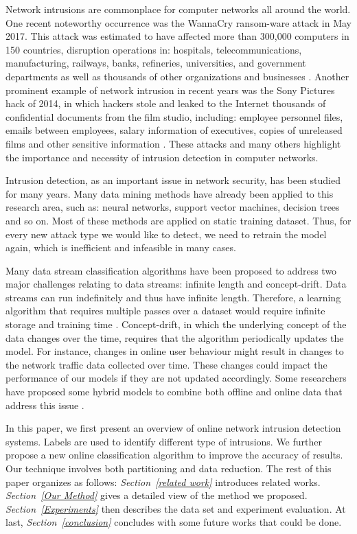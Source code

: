 \documentclass[runningheads]{llncs}
\begin{document}
	Network intrusions are commonplace for computer networks all around the world. One recent noteworthy occurrence was the WannaCry ransom-ware attack in May 2017. This attack was estimated to have affected more than 300,000 computers in 150 countries, disruption operations in: hospitals, telecommunications, manufacturing, railways, banks, refineries, universities, and government departments as well as thousands of other organizations and businesses \cite{Cameron2017}\cite{Hern2017}\cite{Eyerys2017}. Another prominent example of network intrusion in recent years was the Sony Pictures hack of 2014, in which hackers stole and leaked to the Internet thousands of confidential documents from the film studio, including: employee personnel files, emails between employees, salary information of executives, copies of unreleased films and other sensitive information \cite{Siboni2014}. These attacks and many others highlight the importance and necessity of intrusion detection in computer networks.
	
	Intrusion detection, as an important issue in network security, has been studied for many years. Many data mining methods have already been applied to this research area, such as: neural networks, support vector machines, decision trees and so on. Most of these methods are applied on static training dataset. Thus, for every new attack type we would like to detect, we need to retrain the model again, which is inefficient and infeasible in many cases.
	
	Many data stream classification algorithms have been proposed to address two major challenges relating to data streams: infinite length and concept-drift. Data streams can run indefinitely and thus have infinite length. Therefore, a learning algorithm that requires multiple passes over a dataset would require infinite storage and training time \cite{Siboni2014}. Concept-drift, in which the underlying concept of the data changes over the time, requires that the algorithm periodically updates the model. For instance, changes in online user behaviour might result in changes to the network traffic data collected over time. These changes could impact the performance of our models if they are not updated accordingly. Some researchers have proposed some hybrid models to combine both offline and online data that address this issue \cite{Siboni2014}\cite{Masud2013}. 
	
	In this paper, we first present an overview of online network intrusion detection systems. Labels are used to identify different type of intrusions. We further propose a new online classification algorithm to improve the accuracy of results. Our technique involves both partitioning and data reduction. The rest of this paper organizes as follows: \textit{Section~\ref{related work}} introduces related works. \textit{Section~\ref{Our Method}} gives a detailed view of the method we proposed. \textit{Section~\ref{Experiments}} then describes the data set and experiment evaluation. At last, \textit{Section~\ref{conclusion}} concludes with some future works that could be done.
	
\end{document}
